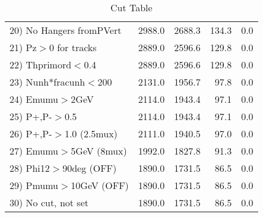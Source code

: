 \begin{table}[h!]
\begin{tabular}{||l||r|r|r|r||}
 20) No Hangers fromPVert &      2988.0 &      2688.3 &       134.3 &         0.0 \\
 21) Pz$>$0 for tracks    &      2889.0 &      2596.6 &       129.8 &         0.0 \\
 22) Thprimord$<$0.4      &      2889.0 &      2596.6 &       129.8 &         0.0 \\
 23) Nunh*fracunh$<$200   &      2131.0 &      1956.7 &        97.8 &         0.0 \\
 24) Emumu$>$2GeV         &      2114.0 &      1943.4 &        97.1 &         0.0 \\
 25) P+,P-$>$0.5          &      2114.0 &      1943.4 &        97.1 &         0.0 \\
 26) P+,P-$>$1.0 (2.5mux) &      2111.0 &      1940.5 &        97.0 &         0.0 \\
 27) Emumu$>$5GeV  (8mux) &      1992.0 &      1827.8 &        91.3 &         0.0 \\
 28) Phi12$>$90deg  (OFF) &      1890.0 &      1731.5 &        86.5 &         0.0 \\
 29) Pmumu$>$10GeV  (OFF) &      1890.0 &      1731.5 &        86.5 &         0.0 \\
 30) No cut, not set      &      1890.0 &      1731.5 &        86.5 &         0.0 \\
 \hline
 \hline
 \end{tabular}
 \caption{Cut Table \cohrp  }
 \label{tab-cut_crhop}
 \end{table}
